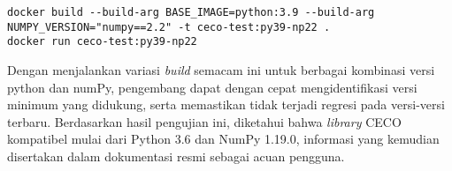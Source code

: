 \begin{lstlisting}[caption=Perintah untuk build dockerfile dan menjalankan container hasil build, label=lst:docker_build]
docker build --build-arg BASE_IMAGE=python:3.9 --build-arg NUMPY_VERSION="numpy==2.2" -t ceco-test:py39-np22 .
docker run ceco-test:py39-np22
\end{lstlisting}


Dengan menjalankan variasi \textit{build} semacam ini untuk berbagai kombinasi versi python dan numPy, pengembang dapat dengan cepat mengidentifikasi versi minimum yang didukung, serta memastikan tidak terjadi regresi pada versi-versi terbaru. Berdasarkan hasil pengujian ini, diketahui bahwa \textit{library} CECO kompatibel mulai dari Python 3.6 dan NumPy 1.19.0, informasi yang kemudian disertakan dalam dokumentasi resmi sebagai acuan pengguna.